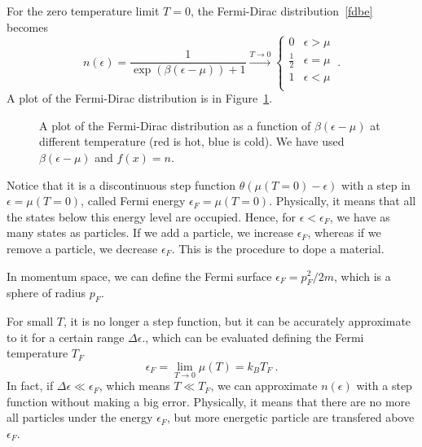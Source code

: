     For the zero temperature limit $T = 0$, the Fermi-Dirac distribution~\eqref{fdbe} becomes 
    \begin{equation}\label{fdtz}
        n(\epsilon) = \frac{1}{\exp(\beta(\epsilon - \mu)) + 1} \xrightarrow{T \rightarrow 0} \begin{cases}
            0 & \epsilon > \mu \\
            \frac{1}{2} & \epsilon = \mu \\
            1 & \epsilon < \mu \\
        \end{cases} ~.
    \end{equation} 
    A plot of the Fermi-Dirac distribution is in Figure~\ref{fig:fd}.
    \begin{figure}
        \centering
        \caption{A plot of the Fermi-Dirac distribution as a function of $\beta (\epsilon - \mu)$ at different temperature (red is hot, blue is cold). We have used $\beta (\epsilon - \mu)$ and $f(x) = n$.}
        \label{fig:fd}
    \end{figure}
    
    Notice that it is a discontinuous step function $\theta (\mu(T=0) - \epsilon)$ with a step in $\epsilon = \mu(T = 0)$, called Fermi energy $\epsilon_F = \mu(T=0)$. Physically, it means that all the states below this energy level are occupied. Hence, for $\epsilon < \epsilon_F$, we have as many states as particles. If we add a particle, we increase $\epsilon_F$, whereas if we remove a particle, we decrease $\epsilon_F$. This is the procedure to dope a material.
    
    In momentum space, we can define the Fermi surface $\epsilon_F = p_F^2 / 2m$, which is a sphere of radius $p_F$.

    For small $T$, it is no longer a step function, but it can be accurately approximate to it for a certain range $\Delta \epsilon$., which can be evaluated defining the Fermi temperature $T_F$
    \begin{equation*}
        \epsilon_F = \lim_{T \rightarrow 0} \mu (T) = k_B T_F ~.
    \end{equation*}
    In fact, if $\Delta \epsilon \ll \epsilon_F$, which means $T \ll T_F$, we can approximate $n(\epsilon)$ with a step function without making a big error. Physically, it means that there are no more all particles under the energy $\epsilon_F$, but more energetic particle are transfered above $\epsilon_F$.

